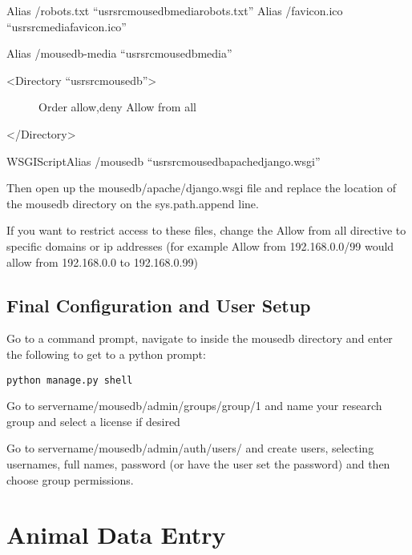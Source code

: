 \documentclass[letterpaper,10pt,english]{sphinxmanual}
\begin{document}
Alias /robots.txt ``usrsrcmousedbmediarobots.txt''
Alias /favicon.ico ``usrsrcmediafavicon.ico''

Alias /mousedb-media ``usrsrcmousedbmedia''
\begin{description}
\item[{\textless{}Directory ``usrsrcmousedb''\textgreater{}}] \leavevmode
Order allow,deny
Allow from all

\end{description}

\textless{}/Directory\textgreater{}

WSGIScriptAlias /mousedb ``usrsrcmousedbapachedjango.wsgi''

Then open up the mousedb/apache/django.wsgi file and replace the location of the mousedb directory on the sys.path.append line.

If you want to restrict access to these files, change the Allow from all directive to specific domains or ip addresses (for example Allow from 192.168.0.0/99 would allow from 192.168.0.0 to 192.168.0.99)


\section{Final Configuration and User Setup}
\label{installation:final-configuration-and-user-setup}
Go to a command prompt, navigate to inside the mousedb directory and enter the following to get to a python prompt:

\begin{Verbatim}[commandchars=@\[\]]
python manage.py shell
\end{Verbatim}

Go to servername/mousedb/admin/groups/group/1 and name your research group and select a license if desired

Go to servername/mousedb/admin/auth/users/ and create users, selecting usernames, full names, password (or have the user set the password) and then choose group permissions.


\chapter{Animal Data Entry}
\label{usage:animal-data-entry}\label{usage::doc}
\end{document}
